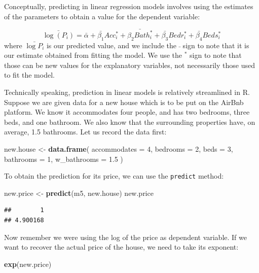 \documentclass[
]{book}
\newenvironment{Shaded}{\begin{snugshade}}{\end{snugshade}}
\newcommand{\DataTypeTok}[1]{\textcolor[rgb]{0.13,0.29,0.53}{#1}}
\newcommand{\DecValTok}[1]{\textcolor[rgb]{0.00,0.00,0.81}{#1}}
\newcommand{\FloatTok}[1]{\textcolor[rgb]{0.00,0.00,0.81}{#1}}
\newcommand{\KeywordTok}[1]{\textcolor[rgb]{0.13,0.29,0.53}{\textbf{#1}}}
\newcommand{\NormalTok}[1]{#1}
\newcommand{\StringTok}[1]{\textcolor[rgb]{0.31,0.60,0.02}{#1}}
\begin{document}
Conceptually, predicting in linear regression models involves using the estimates of the parameters to obtain a value for the dependent variable:

\[
\bar{\log(P_i)} = \bar{\alpha} + \bar{\beta_1} Acc_i^* + \bar{\beta_2 Bath_i^*} + \bar{\beta_3} Bedr_i^* + \bar{\beta_4} Beds_i^*
\]
where \(\bar{\log{P_i}}\) is our predicted value, and we include the \(\bar{}\) sign to note that it is our estimate obtained from fitting the model. We use the \(^*\) sign to note that those can be new values for the explanatory variables, not necessarily those used to fit the model.

Technically speaking, prediction in linear models is relatively streamlined in R. Suppose we are given data for a new house which is to be put on the AirBnb platform. We know it accommodates four people, and has two bedrooms, three beds, and one bathroom. We also know that the surrounding properties have, on average, 1.5 bathrooms. Let us record the data first:

\begin{Shaded}
\begin{Highlighting}[]
\NormalTok{new.house <-}\StringTok{ }\KeywordTok{data.frame}\NormalTok{(}
  \DataTypeTok{accommodates =} \DecValTok{4}\NormalTok{, }
  \DataTypeTok{bedrooms =} \DecValTok{2}\NormalTok{,}
  \DataTypeTok{beds =} \DecValTok{3}\NormalTok{,}
  \DataTypeTok{bathrooms =} \DecValTok{1}\NormalTok{,}
  \DataTypeTok{w_bathrooms =} \FloatTok{1.5}
\NormalTok{)}
\end{Highlighting}
\end{Shaded}

To obtain the prediction for its price, we can use the \texttt{predict} method:

\begin{Shaded}
\begin{Highlighting}[]
\NormalTok{new.price <-}\StringTok{ }\KeywordTok{predict}\NormalTok{(m5, new.house)}
\NormalTok{new.price}
\end{Highlighting}
\end{Shaded}

\begin{verbatim}
##        1 
## 4.900168
\end{verbatim}

Now remember we were using the log of the price as dependent variable. If we want to recover the actual price of the house, we need to take its exponent:

\begin{Shaded}
\begin{Highlighting}[]
\KeywordTok{exp}\NormalTok{(new.price)}
\end{Highlighting}
\end{Shaded}
\end{document}
